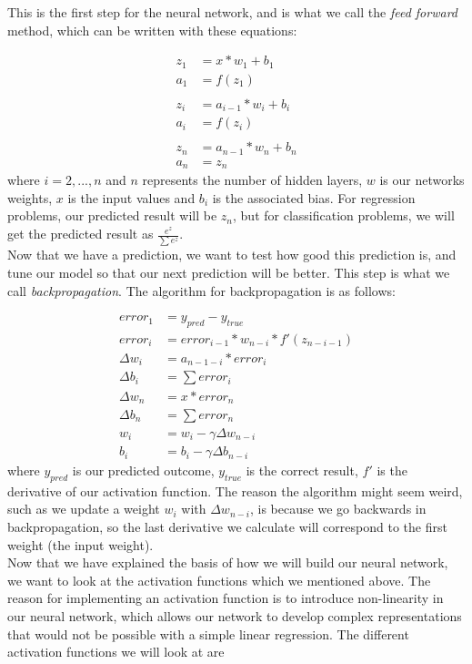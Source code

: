 \documentclass[english,notitlepage,reprint,nofootinbib]{revtex4-1}  %
\begin{document}
This is the first step for the neural network, and is what we call the \textit{feed forward} method, which can be written with these equations:

\begin{align*}
    z_1 &= x*w_1 + b_1 \\
    a_1 &= f(z_1) \\
    \\
    z_i &= a_{i-1}*w_i + b_i \\
    a_i &= f(z_i) \\
    \\
    z_n &= a_{n-1}*w_n + b_n \\
    a_n &= z_n
\end{align*}
where $i = 2,...,n$ and $n$ represents the number of hidden layers, $w$ is our networks weights, $x$ is the input values and $b_i$ is the associated bias. For regression problems, our predicted result will be $z_n$, but for classification problems, we will get the predicted result as $\frac{e^z}{\sum e^z}$.
\\
Now that we have a prediction, we want to test how good this prediction is, and tune our model so that our next prediction will be better. This step is what we call \textit{backpropagation}. The algorithm for backpropagation is as follows:

\begin{align*}
    error_1 &= y_{pred} - y_{true} \\ 
    error_i &= error_{i-1} * w_{n-i} * f'(z_{n-i-1}) \\ 
    \Delta w_i &= a_{n-1-i} * error_i \\ 
    \Delta b_i &= \sum error_i \\ 
    \Delta w_n &= x * error_n \\ 
    \Delta b_n &= \sum error_n \\ 
    w_i &= w_i - \gamma \Delta w_{n-i} \\ 
    b_i &= b_i - \gamma \Delta b_{n-i}
\end{align*}
where $y_{pred}$ is our predicted outcome, $y_{true}$ is the correct result, $f'$ is the derivative of our activation function.
The reason the algorithm might seem weird, such as we update a weight $w_i$ with $\Delta w_{n-i}$, is because we go backwards in backpropagation, so the last derivative we calculate will correspond to the first weight (the input weight). 
\\
Now that we have explained the basis of how we will build our neural network, we want to look at the activation functions which we mentioned above. The reason for implementing an activation function is to introduce non-linearity in our neural network, which allows our network to develop complex representations that would not be possible with a simple linear regression.
The different activation functions we will look at are
\end{document}
